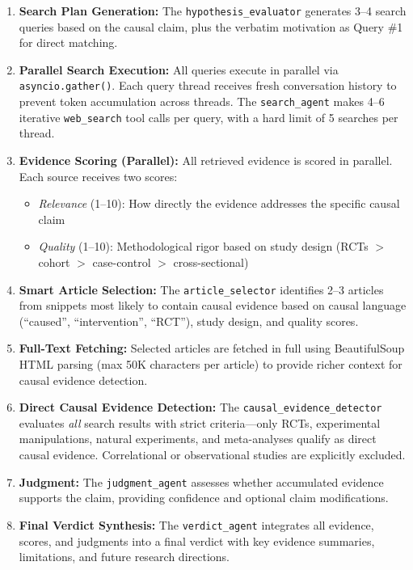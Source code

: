 \begin{enumerate}[noitemsep]
    \item \textbf{Search Plan Generation:} The \texttt{hypothesis\_evaluator} generates 3--4 search queries based on the causal claim, plus the verbatim motivation as Query \#1 for direct matching.
    
    \item \textbf{Parallel Search Execution:} All queries execute in parallel via \texttt{asyncio.gather()}. Each query thread receives fresh conversation history to prevent token accumulation across threads. The \texttt{search\_agent} makes 4--6 iterative \texttt{web\_search} tool calls per query, with a hard limit of 5 searches per thread.
    
    \item \textbf{Evidence Scoring (Parallel):} All retrieved evidence is scored in parallel. Each source receives two scores:
    \begin{itemize}[noitemsep]
        \item \textit{Relevance} (1--10): How directly the evidence addresses the specific causal claim
        \item \textit{Quality} (1--10): Methodological rigor based on study design (RCTs $>$ cohort $>$ case-control $>$ cross-sectional)
    \end{itemize}
    
    \item \textbf{Smart Article Selection:} The \texttt{article\_selector} identifies 2--3 articles from snippets most likely to contain causal evidence based on causal language (``caused'', ``intervention'', ``RCT''), study design, and quality scores.
    
    \item \textbf{Full-Text Fetching:} Selected articles are fetched in full using BeautifulSoup HTML parsing (max 50K characters per article) to provide richer context for causal evidence detection.
    
    \item \textbf{Direct Causal Evidence Detection:} The \texttt{causal\_evidence\_detector} evaluates \textit{all} search results with strict criteria---only RCTs, experimental manipulations, natural experiments, and meta-analyses qualify as direct causal evidence. Correlational or observational studies are explicitly excluded.
    
    \item \textbf{Judgment:} The \texttt{judgment\_agent} assesses whether accumulated evidence supports the claim, providing confidence and optional claim modifications.
    
    \item \textbf{Final Verdict Synthesis:} The \texttt{verdict\_agent} integrates all evidence, scores, and judgments into a final verdict with key evidence summaries, limitations, and future research directions.
\end{enumerate}

